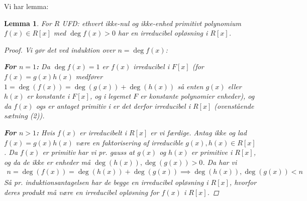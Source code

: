 \documentclass[10pt,twoside,openany,final]{memoir}
\theoremstyle{break}
\newtheorem{lemma}[section]{Lemma}
\theoremstyle{Break}
\begin{document}
Vi har lemma:
\begin{lemma}
For $R$ UFD: ethvert ikke-nul og ikke-enhed primitivt polynomium $f(x) \in R[x]$ med $\deg f(x) >0$ har en irreducibel opløsning i $R[x]$.
\begin{proof}
Vi gør det ved induktion over $n= \deg f(x)$: 

\textbf{For $n=1$:} Da $ \deg f(x)=1$ er $f(x)$ irreducibel i $F[x]$ (for $f(x)=g(x)h(x)$ medfører $1=\deg(f(x))=\deg(g(x))+\deg(h(x))$ så enten $g(x)$ eller $h(x)$ er konstante i $F[x]$, og i legemet $F$ er konstante polynomier enheder), og da $f(x)$ ogs er antaget primitiv i er det derfor irreducibel i $R[x]$ (ovenstående sætning (2)).

\textbf{For $n > 1$:} Hvis $f(x)$ er irreducibelt i $R[x]$ er vi færdige. Antag ikke og lad $f(x)=g(x)h(x)$ være en faktorisering af irreducible $g(x),h(x) \in R[x]$. Da $f(x)$ er primitiv har vi pr. gauss at $g(x)$ og $h(x)$ er primitive i $R[x]$, og da de ikke er enheder må $\deg(h(x)), \deg(g(x)) > 0$. Da har vi
\begin{align*}
n=\deg(f(x)) = \deg(h(x)) + \deg(g(x)) \implies \deg(h(x)),\deg(g(x)) < n
\end{align*}
Så pr. induktionsantagelsen har de begge en irreducibel opløsning i $R[x]$, hvorfor deres produkt må være en irreducibel opløsning for $f(x)$ i $R[x]$.
\end{proof}
\end{lemma}
\end{document}
